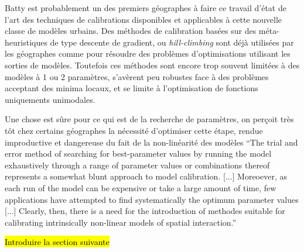 Batty est probablement un des premiers géographes à faire ce travail d'état de l'art des techniques de calibrations disponibles et applicables à cette nouvelle classe de modèles urbains. Des méthodes de calibration basées sur des méta-heuristiques de type descente de gradient, ou \textit{hill-climbing} sont déjà utilisées par les géographes comme \textcite[159-160]{Batty1976} pour résoudre des problèmes d'optimisations utilisant les sorties de modèles. Toutefois ces méthodes sont encore trop souvent limitées à des modèles à 1 ou 2 paramètres, s'avèrent peu robustes face à des problèmes acceptant des minima locaux, et se limite à l'optimisation de fonctions uniquements unimodales. 

Une chose est sûre pour ce qui est de la recherche de paramètres, on perçoit très tôt chez certains géographes la nécessité d'optimiser cette étape, rendue improductive et dangereuse du fait de la non-linéarité des modèles \enquote{The trial and error method of searching for best-parameter values by running the model exhaustively through a range of parameter values or combinations thereof represents a somewhat blunt approach to model calibration. [...] Moreoever, as each run of the model can be expensive or take a large amount of time, few applications have attempted to find systematically the optimum parameter values [...] Clearly, then, there is a need for the introduction of methodes suitable for calibrating intrinsically non-linear models of spatial interaction.} \autocite[155]{Batty1976}



\hl{Introduire la section suivante}



